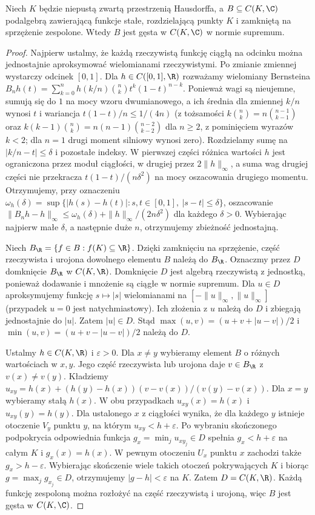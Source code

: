 \begin{lemat}
\label{lem:stone-weierstrass31}
Niech $K$ będzie niepustą zwartą przestrzenią Hausdorffa, a
$B\subseteq C(K,\C)$ podalgebrą zawierającą funkcje stałe,
rozdzielającą punkty $K$ i zamkniętą na sprzężenie zespolone.
Wtedy $B$ jest gęsta w $C(K,\C)$ w normie supremum.
\end{lemat}
\begin{proof}
Najpierw ustalmy, że każdą rzeczywistą funkcję ciągłą na odcinku
można jednostajnie aproksymować wielomianami rzeczywistymi.
Po zmianie zmiennej wystarczy odcinek $[0,1]$. Dla $h\in C([0,1],\R)$
rozważamy wielomiany Bernsteina
$B_nh(t)=\sum_{k=0}^nh(k/n)\binom nk t^k(1-t)^{n-k}$.
Ponieważ wagi są nieujemne, sumują się do $1$ na mocy wzoru dwumianowego, a ich
średnia dla zmiennej $k/n$ wynosi $t$ i wariancja
$t(1-t)/n\le1/(4n)$ (z tożsamości
$k\binom nk=n\binom{n-1}{k-1}$ oraz
$k(k-1)\binom nk=n(n-1)\binom{n-2}{k-2}$ dla $n\ge2$,
z pominięciem wyrazów $k<2$; dla $n=1$ drugi moment
silniowy wynosi zero).
Rozdzielamy sumę na $|k/n-t|\le\delta$ i pozostałe
indeksy. W pierwszej części różnica wartości $h$ jest
ograniczona przez moduł ciągłości, w drugiej przez
$2\|h\|_\infty$, a suma wag drugiej części nie przekracza
$t(1-t)/(n\delta^2)$ na mocy oszacowania drugiego momentu.
Otrzymujemy, przy oznaczeniu
$\omega_h(\delta)=\sup\{|h(s)-h(t)|:s,t\in[0,1],\ |s-t|\le\delta\}$,
oszacowanie
$\|B_nh-h\|_\infty\le\omega_h(\delta)
+\|h\|_\infty/(2n\delta^2)$ dla każdego $\delta>0$.
Wybierając najpierw małe $\delta$, a następnie duże $n$,
otrzymujemy zbieżność jednostajną.

Niech $B_\R=\{f\in B:f(K)\subseteq\R\}$.
Dzięki zamknięciu na sprzężenie, część rzeczywista i urojona
dowolnego elementu $B$ należą do $B_\R$.
Oznaczmy przez $D$ domknięcie $B_\R$ w $C(K,\R)$.
Domknięcie $D$ jest algebrą rzeczywistą z jednostką,
ponieważ dodawanie i mnożenie są ciągłe w normie supremum.
Dla $u\in D$ aproksymujemy funkcję $s\mapsto|s|$
wielomianami na $[-\|u\|_\infty,\|u\|_\infty]$
(przypadek $u=0$ jest natychmiastowy). Ich złożenia
z $u$ należą do $D$ i zbiegają jednostajnie do $|u|$.
Zatem $|u|\in D$.
Stąd $\max(u,v)=(u+v+|u-v|)/2$ i
$\min(u,v)=(u+v-|u-v|)/2$ należą do $D$.

Ustalmy $h\in C(K,\R)$ i $\varepsilon>0$.
Dla $x\ne y$ wybieramy element $B$ o różnych wartościach
w $x,y$. Jego część rzeczywista lub urojona daje
$v\in B_\R$ z $v(x)\ne v(y)$. Kładziemy
$u_{xy}=h(x)+(h(y)-h(x))(v-v(x))/(v(y)-v(x))$.
Dla $x=y$ wybieramy stałą $h(x)$.
W obu przypadkach $u_{xy}(x)=h(x)$ i $u_{xy}(y)=h(y)$.
Dla ustalonego $x$ z ciągłości wynika, że dla każdego $y$
istnieje otoczenie $V_y$ punktu $y$, na którym
$u_{xy}<h+\varepsilon$. Po wybraniu skończonego podpokrycia
odpowiednia funkcja $g_x=\min_j u_{xy_j}\in D$ spełnia
$g_x<h+\varepsilon$ na całym $K$ i $g_x(x)=h(x)$.
W pewnym otoczeniu $U_x$ punktu $x$ zachodzi także
$g_x>h-\varepsilon$. Wybierając skończenie wiele takich
otoczeń pokrywających $K$ i biorąc $g=\max_j g_{x_j}\in D$,
otrzymujemy $|g-h|<\varepsilon$ na $K$.
Zatem $D=C(K,\R)$. Każdą funkcję zespoloną można rozłożyć
na część rzeczywistą i urojoną, więc $B$ jest gęsta w $C(K,\C)$.
\end{proof}

